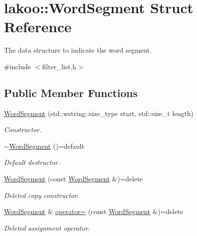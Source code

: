 \hypertarget{structlakoo_1_1_word_segment}{}\section{lakoo\+:\+:Word\+Segment Struct Reference}
\label{structlakoo_1_1_word_segment}


The data structure to indicate the word segment.  




{\ttfamily \#include $<$filter\+\_\+list.\+h$>$}

\subsection*{Public Member Functions}
\begin{DoxyCompactItemize}
\item 
\hyperlink{structlakoo_1_1_word_segment_a81c5d053fe3622a51cbae35c3083fda8}{Word\+Segment} (std\+::wstring\+::size\+\_\+type start, std\+::size\+\_\+t length)
\begin{DoxyCompactList}\small\item\em Constructor. \end{DoxyCompactList}\item 
\mbox{\label{structlakoo_1_1_word_segment_a82d5edc6627c03732b3bb4c7449bbf37}} 
\hyperlink{structlakoo_1_1_word_segment_a82d5edc6627c03732b3bb4c7449bbf37}{$\sim$\+Word\+Segment} ()=default
\begin{DoxyCompactList}\small\item\em Default destructor. \end{DoxyCompactList}\item 
\mbox{\label{structlakoo_1_1_word_segment_a340f945d7cab5a301799e3dbc1accfc9}} 
\hyperlink{structlakoo_1_1_word_segment_a340f945d7cab5a301799e3dbc1accfc9}{Word\+Segment} (const \hyperlink{structlakoo_1_1_word_segment}{Word\+Segment} \&)=delete
\begin{DoxyCompactList}\small\item\em Deleted copy constructor. \end{DoxyCompactList}\item 
\mbox{\label{structlakoo_1_1_word_segment_a4eff6d54d93c73a314ca79d0316a9039}} 
\hyperlink{structlakoo_1_1_word_segment}{Word\+Segment} \& \hyperlink{structlakoo_1_1_word_segment_a4eff6d54d93c73a314ca79d0316a9039}{operator=} (const \hyperlink{structlakoo_1_1_word_segment}{Word\+Segment} \&)=delete
\begin{DoxyCompactList}\small\item\em Deleted assignment operator. \end{DoxyCompactList}\end{DoxyCompactItemize}
